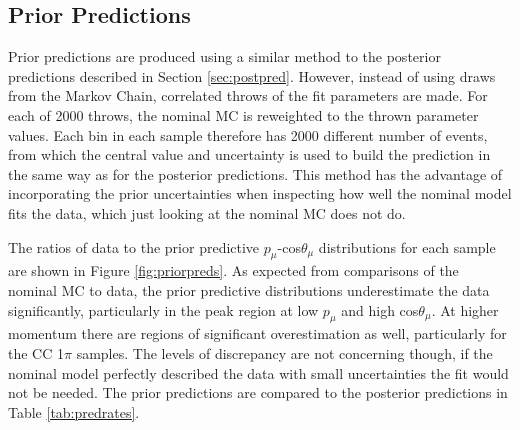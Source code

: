 \subsection{Prior Predictions}

Prior predictions are produced using a similar method to the posterior predictions described in Section \ref{sec:postpred}. However, instead of using draws from the Markov Chain, correlated throws of the fit parameters are made. For each of 2000 throws, the nominal MC is reweighted to the thrown parameter values. Each bin in each sample therefore has 2000 different number of events, from which the central value and uncertainty is used to build the prediction in the same way as for the posterior predictions. This method has the advantage of incorporating the prior uncertainties when inspecting how well the nominal model fits the data, which just looking at the nominal MC does not do. 

The ratios of data to the prior predictive $p_{\mu}$-cos$\theta_{\mu}$ distributions for each sample are shown in Figure \ref{fig:priorpreds}. As expected from comparisons of the nominal MC to data, the prior predictive distributions underestimate the data significantly, particularly in the peak region at low $p_{\mu}$ and high cos$\theta_{\mu}$. At higher momentum there are regions of significant overestimation as well, particularly for the CC 1$\pi$ samples. The levels of discrepancy are not concerning though, if the nominal model perfectly described the data with small uncertainties the fit would not be needed. The prior predictions are compared to the posterior predictions in Table \ref{tab:predrates}.

